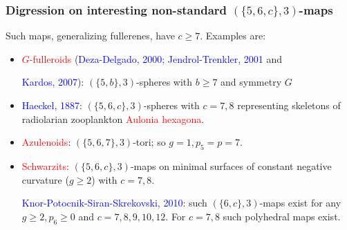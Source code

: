 \documentclass{beamer}
\begin{document}
\begin{frame}\frametitle{Digression on interesting non-standard  
$(\{5,6,c\},3)$-maps}
Such maps, 
generalizing   
 fullerenes, have $c\ge 7$. Examples are: 
\begin{itemize}
\item \textcolor{red}{$G$-fulleroids} (\textcolor{blue}{Deza-Delgado, 
2000; Jendrol-Trenkler, 2001} and 

\textcolor{blue}{Kardos, 2007}): $(\{5,b\},3)$-spheres 
with 
$b$$\ge$$ 7$ and 
symmetry $G$
\item \textcolor{blue}{Haeckel, 1887}: $(\{5,6,c\},3)$-spheres
 with $c=7,8$ representing
skeletons of  radiolarian zooplankton \textcolor{red}{Aulonia hexagona}.

\item \textcolor{red}{Azulenoids}: $(\{5,6,7\},3)$-tori; so 
$g=1,p_5=p=7$.

\item \textcolor{red}{Schwarzits}: $(\{5,6,c\},3)$-maps on minimal 
surfaces of constant
negative curvature ($g\ge 2$)  with $c=7,8$.

 \textcolor{blue}{Knor-Potocnik-Siran-Skrekovski, 2010}: such  
$(\{6,c\},3)$-maps exist for 
any $g\ge 2, p_6\ge 0$ and $c=7,8,9,10,12$. For $c=7,8$ such polyhedral 
maps exist. 
\end{itemize}
 
\end{frame}
\end{document}

